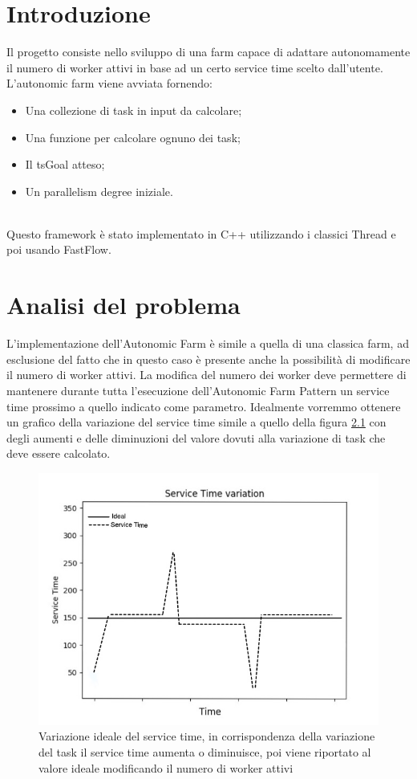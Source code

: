 \documentclass[12pt]{report}
\begin{document}

\newpage
\doublespacing\tableofcontents
\newpage
\chapter{Introduzione}

Il progetto consiste nello sviluppo di una farm capace di adattare autonomamente il numero di worker attivi in base ad un certo service time scelto dall'utente.\\L'autonomic farm viene avviata fornendo:
\begin{itemize}
\item Una collezione di task in input da calcolare;
\item Una funzione per calcolare ognuno dei task;
\item Il tsGoal atteso;
\item Un parallelism degree iniziale.
\end{itemize}\\Questo framework è stato implementato in C++ utilizzando i classici Thread e poi usando FastFlow.

\chapter{Analisi del problema}

L'implementazione dell'Autonomic Farm è simile a quella di una classica farm, ad esclusione del fatto che in questo caso è presente anche la possibilità di modificare il numero di worker attivi.
La modifica del numero dei worker deve permettere di mantenere durante tutta l'esecuzione dell'Autonomic Farm Pattern un service time prossimo a quello indicato come parametro. Idealmente vorremmo ottenere un grafico della variazione del service time simile a quello della figura \ref{Ideal} con degli aumenti e delle diminuzioni del valore dovuti alla variazione di task che deve essere calcolato.

\begin{figure}[H]
\centering
  \includegraphics[width=0.7\linewidth]{IdealTS.jpg}
  \caption{Variazione ideale del service time, in corrispondenza della variazione del task il service time aumenta o diminuisce, poi viene riportato al valore ideale modificando il numero di worker attivi}
  \label{Ideal}
\end{figure}
\end{document}
